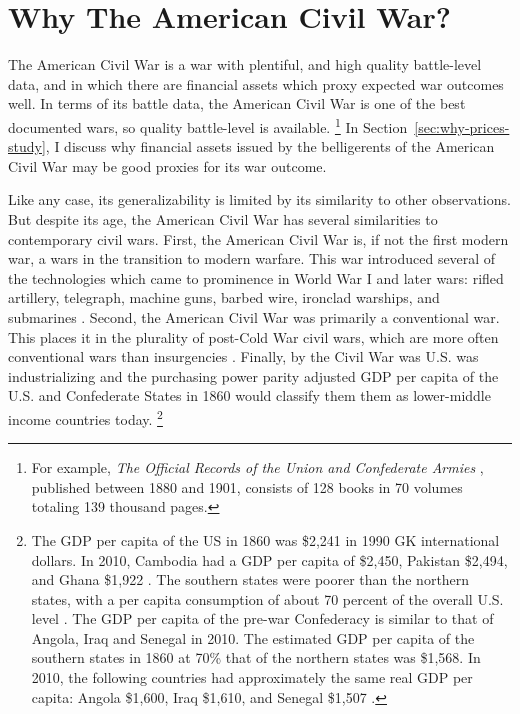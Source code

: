 \section{Why The American Civil War?}
\label{sec:why-american-civil}

The American Civil War is a war with plentiful, and high quality battle-level data, and in which there are financial assets which proxy expected war outcomes well.
In terms of its battle data, the American Civil War is one of the best documented wars, so quality battle-level is available.%
\footnote{%
  For example, \textit{The Official Records of the Union and  Confederate Armies} \parencites{US1901}, published between 1880 and 1901, consists of 128 books in 70 volumes totaling 139 thousand pages.

} %
In Section~\ref{sec:why-prices-study}, I discuss why financial assets issued by the belligerents of the American Civil War may be good proxies for its war outcome.

Like any case, its generalizability is limited by its similarity to other observations.
But despite its age, the American Civil War has several similarities to contemporary civil wars.
First, the American Civil War is, if not the first modern war, a wars in the transition to modern warfare.
This war introduced several of the technologies which came to prominence in World War I and later wars: rifled artillery, telegraph, machine guns, barbed wire, ironclad warships, and submarines \parencites[89][]{Fuller1956a}[760]{Weiss1966}.
Second, the American Civil War was primarily a conventional war.
This places it in the plurality of post-Cold War civil wars, which are more often conventional wars than insurgencies \parencite[423]{kalyvas2010inter}. %
Finally, by the Civil War was U.S. was industrializing and the purchasing power parity adjusted GDP per capita of the U.S. and Confederate States in 1860 would classify them them as lower-middle income countries today.%
\footnote{%
  The GDP per capita of the US in 1860 was \$2,241 in 1990 GK international dollars. %
  In 2010, Cambodia had a GDP per capita of \$2,450, Pakistan \$2,494, and Ghana \$1,922 \parencite{BoltZanden2013}. %
  The southern states were poorer than the northern states, with a per capita consumption of about 70 percent of the overall U.S. level \parencite[324]{GoldinLewis1975}.
  The GDP per capita of the pre-war Confederacy is similar to that of Angola, Iraq and Senegal in 2010.%
  The estimated GDP per capita of the southern states in 1860 at 70\% that of the northern states was \$1,568. %
  In 2010, the following countries had approximately the same real GDP per capita: Angola \$1,600, Iraq \$1,610, and Senegal \$1,507 \parencite{BoltZanden2013}. %
}

